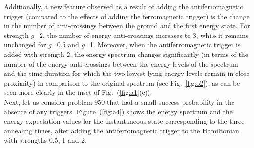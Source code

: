 \documentclass[../main.tex]{subfiles}
\begin{document}
Additionally, a new feature observed as a result of adding the antiferromagnetic trigger (compared to the effects of adding the ferromagnetic trigger) is the change in the number of anti-crossings between the ground and the first energy state. For strength $g$=2, the number of energy anti-crossings increases to 3, while it remains unchanged for $g$=0.5 and $g$=1. Moreover, when the antiferromagnetic trigger is added with strength 2, the energy spectrum changes significantly (in terms of the number of the energy anti-crossings between the energy levels of the spectrum and the time duration for which the two lowest lying energy levels remain in close proximity) in comparison to the original spectrum (see Fig.~\ref{fig:o2}), as can be seen more clearly in the inset of Fig.~(\ref{fig:a1}(c)).\\

Next, let us consider problem 950 that had a small success probability in the absence of any triggers. Figure~(\ref{fig:a4}) shows the energy spectrum and the energy expectation values for the instantaneous state corresponding to the three annealing times, after adding the antiferromagnetic trigger to the Hamiltonian with strengths 0.5, 1 and 2. 
\end{document}
